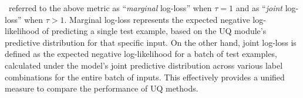 






\citet{OsbandWeAsSeDwLuVa22}~referred to the above metric as ``\emph{marginal} log-loss'' when 
$\tau=1$ and as ``\emph{joint} log-loss'' when $\tau > 1$. Marginal log-loss represents the expected negative log-likelihood of predicting a single test example, based on the UQ module’s predictive distribution for that specific input. On the other hand, joint log-loss is defined as the expected negative log-likelihood for a batch of test examples, calculated under the model’s joint predictive distribution across various label combinations for the entire batch of inputs. This effectively provides a unified measure to compare the performance of UQ methods. 


